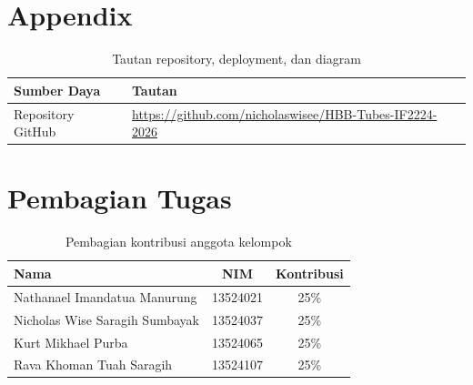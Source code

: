 \documentclass[12pt,a4paper]{article}
\newcommand{\RepoURL}{https://github.com/nicholaswisee/HBB-Tubes-IF2224-2026}
\begin{document}
\section*{Appendix}

\begin{table}[H]
  \centering
  \begin{small}
  \setlength{\tabcolsep}{5pt}
  \begin{tabular}{>{\raggedright\arraybackslash}p{3.1cm}>{\raggedright\arraybackslash}p{11.7cm}}
    \toprule
    \textbf{Sumber Daya} & \textbf{Tautan} \\
    \midrule
    Repository GitHub & \url{\RepoURL} \\
    \bottomrule
  \end{tabular}
  \end{small}
  \caption{Tautan repository, deployment, dan diagram}
\end{table}

\section*{Pembagian Tugas}

\begin{table}[H]
  \centering
  \begin{tabular}{>{\raggedright\arraybackslash}p{7.6cm}cc}
    \toprule
    \textbf{Nama} & \textbf{NIM} & \textbf{Kontribusi} \\
    \midrule
    Nathanael Imandatua Manurung & 13524021 & 25\% \\
    Nicholas Wise Saragih Sumbayak & 13524037 & 25\% \\
    Kurt Mikhael Purba & 13524065 & 25\% \\
    Rava Khoman Tuah Saragih & 13524107 & 25\% \\
    \bottomrule
  \end{tabular}
  \caption{Pembagian kontribusi anggota kelompok}
\end{table}
\end{document}
